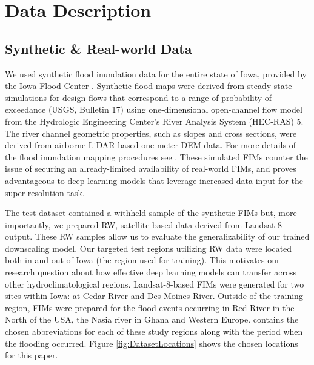 \section{Data Description}
\label{sec:DataDescription}

\subsection{Synthetic \& Real-world Data}
We used synthetic flood inundation data for the entire state of Iowa, provided by the Iowa Flood Center \cite{RealTimeFloodForecastingandInformationSystemfortheStateofIowa2017}. Synthetic flood maps were derived from steady-state simulations for design flows that correspond to a range of probability of exceedance (USGS, Bulletin 17) using one-dimensional open-channel flow model from the Hydrologic Engineering Center’s River Analysis System (HEC-RAS) 5. The river channel geometric properties, such as slopes
and cross sections, were derived from airborne LiDAR based one-meter \ac{DEM} data. For more details of the flood inundation mapping procedures see \cite{Gilles2012InundationMappingInitiativesIowaFloodCenter}.
These simulated \acp{FIM} counter the issue of securing an already-limited availability of real-world \acp{FIM}, and proves advantageous to deep learning models that leverage increased data input for the super resolution task. 

The test dataset contained a withheld sample of the synthetic \acp{FIM} but, more importantly, we prepared \ac{RW}, satellite-based data derived from Landsat-8 output. These \ac{RW} samples allow us to evaluate the generalizability of our trained downscaling model. Our targeted test regions utilizing \ac{RW} data were located both in and out of Iowa (the region used for training). This motivates our research question about how effective deep learning models can transfer across other hydroclimatological regions. Landsat-8-based \acp{FIM} were generated for two sites within Iowa: at Cedar River and Des Moines River. Outside of the training region, \acp{FIM} were prepared for the flood events occurring in Red River in the North of the USA, the Nasia river in Ghana and Western Europe.  contains the chosen abbreviations for each of these study regions along with the period when the flooding occurred. Figure \ref{fig:DatasetLocations} shows the chosen locations for this paper. 

